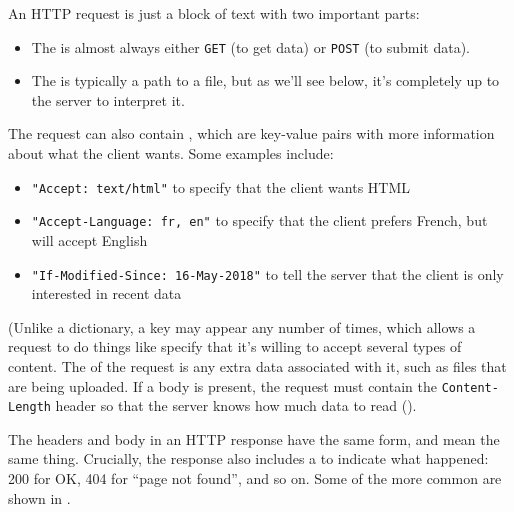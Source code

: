 An HTTP request is just a block of text with two important parts:

\begin{itemize}
\item
  The  is almost always either \texttt{GET} (to get data) or \texttt{POST} (to submit data).
\item
  The  is typically a path to a file,
  but as we'll see below,
  it's completely up to the server to interpret it.
\end{itemize}

The request can also contain ,
which are key-value pairs with more information about what the client wants.
Some examples include:

\begin{itemize}
\item
  \texttt{"Accept:\ text/html"} to specify that the client wants HTML
\item
  \texttt{"Accept-Language:\ fr,\ en"} to specify that the client prefers French, but will accept English
\item
  \texttt{"If-Modified-Since:\ 16-May-2018"} to tell the server that the client is only interested in recent data
\end{itemize}

\noindent
(Unlike a dictionary, a key may appear any number of times,
which allows a request to do things like specify that it's willing to accept several types of content.
The  of the request is any extra data associated with it,
such as files that are being uploaded.
If a body is present,
the request must contain the \texttt{Content-Length} header
so that the server knows how much data to read
().


The headers and body in an HTTP response have the same form, and mean the same thing.
Crucially,
the response also includes a 
to indicate what happened:
200 for OK, 404 for ``page not found'', and so on.
Some of the more common are shown in .

